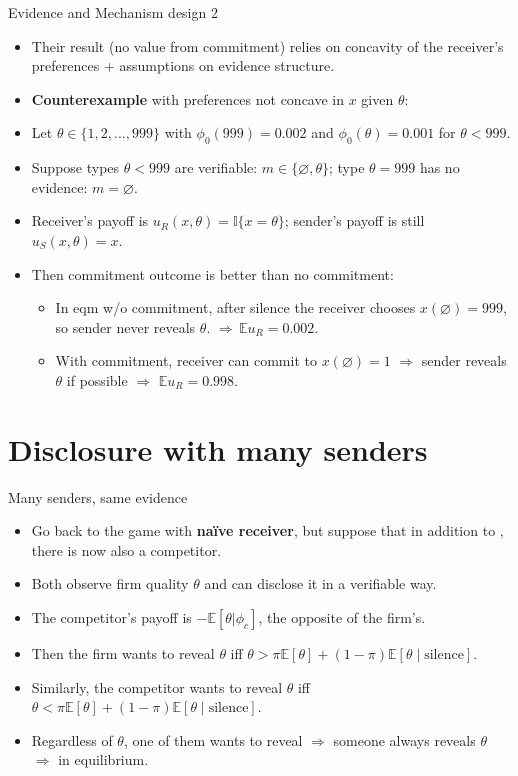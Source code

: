 \documentclass[english,10pt
,aspectratio=169
]{beamer}
\begin{document}
\begin{frame}{Evidence and Mechanism design 2}
\begin{itemize}
	\item Their result (no value from commitment) relies on concavity of the receiver's preferences + assumptions on evidence structure. 
	\item \textbf{Counterexample} with preferences not concave in $x$ given $\theta$:
	\item Let $\theta \in \{1,2,...,999\}$ with $\phi_0(999) = 0.002$ and $\phi_0(\theta) = 0.001$ for $\theta < 999$.
	\item Suppose types $\theta<999$ are verifiable: $m \in \{\varnothing, \theta\}$; type $\theta=999$ has no evidence: $m = \varnothing$.
	\item Receiver's payoff is $u_R(x,\theta) = \mathbb{I}\{x=\theta\}$; sender's payoff is still $u_S(x,\theta)=x$.
	\pause \bigskip 
	\item Then commitment outcome is better than no commitment:
	\begin{itemize}
		\item In eqm w/o commitment, after silence the receiver chooses $x(\varnothing)=999$, so sender never reveals $\theta$. $\Rightarrow \, \mathbb{E}u_R = 0.002$.
		\item With commitment, receiver can commit to $x(\varnothing)=1$ $\Rightarrow$ sender reveals $\theta$ if possible $\Rightarrow$ $\mathbb{E}u_R = 0.998$.
	\end{itemize}
\end{itemize}
\end{frame}


\section{Disclosure with many senders}

\begin{frame}{Many senders, same evidence \citep{milgrom_relying_1986}}
\begin{itemize}
	\item Go back to the game with \textbf{na{\"i}ve receiver}, but suppose that in addition to , there is now also \alert{a competitor}.
	\item Both observe firm quality $\theta$ and can disclose it in a verifiable way.
	\item The competitor's payoff is $-\mathbb{E}[\theta|\phi_c]$, the opposite of the firm's.
	
	\pause\bigskip 
	\item Then the firm wants to reveal $\theta$ iff $\theta > \pi \mathbb{E}[\theta] + (1-\pi) \mathbb{E}[\theta \mid \text{silence}]$.
	\item Similarly, the competitor wants to reveal $\theta$ iff $\theta < \pi \mathbb{E}[\theta] + (1-\pi) \mathbb{E}[\theta \mid \text{silence}]$.
	\item Regardless of $\theta$, one of them wants to reveal $\Rightarrow$ someone always reveals $\theta$ \\
	$\Rightarrow$  in equilibrium.
\end{itemize}
\end{frame}
\end{document}
